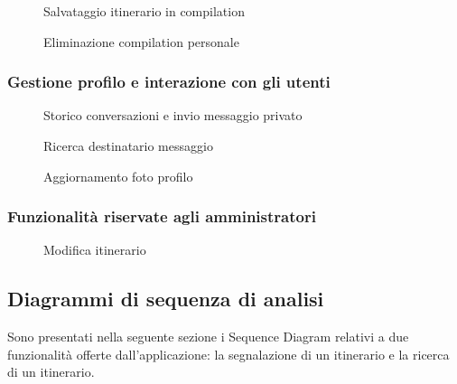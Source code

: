 \documentclass{natourDoc}
\begin{document}
\begin{figure}[!htpb]
	\centering
	
	\caption{Salvataggio itinerario in compilation}
\end{figure}
\FloatBarrier


\begin{figure}[!htpb]
	\centering
	
	\caption{Eliminazione compilation personale}
\end{figure}
\FloatBarrier

\newpage

\subsubsection{Gestione profilo e interazione con gli utenti}
\begin{figure}[!htpb]
	\centering
	
	\caption{Storico conversazioni e invio messaggio privato}
\end{figure}
\FloatBarrier

\begin{figure}[!htpb]
	\centering
	
	\caption{Ricerca destinatario messaggio}
\end{figure}
\FloatBarrier

\begin{figure}[!htpb]
	\centering
	
	\caption{Aggiornamento foto profilo}
\end{figure}
\FloatBarrier

\newpage

\subsubsection{Funzionalità riservate agli amministratori}
\begin{figure}[!htpb]
	\centering
	
	\caption{Modifica itinerario}
\end{figure}
\FloatBarrier

\newpage
\subsection{Diagrammi di sequenza di analisi}
Sono presentati nella seguente sezione i Sequence Diagram relativi a due funzionalità offerte dall'applicazione:
la segnalazione di un itinerario e la ricerca di un itinerario.
\end{document}
